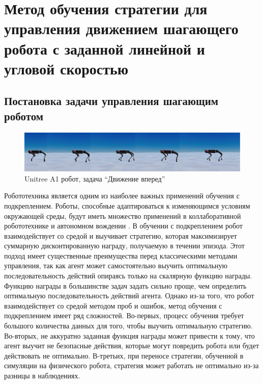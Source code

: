 \chapter{Метод обучения стратегии для управления движением
шагающего робота с заданной линейной и угловой скоростью}\label{ch:ch3}

\section{Постановка задачи управления шагающим роботом}


\begin{figure}[ht]
    \includegraphics[width=1\textwidth]{images/move_forward.png}
    \caption{Unitree A1 робот, задача ``Движение вперед''}
    \label{fig:mv_forward}
\end{figure}


Робототехника является одним из наиболее важных применений обучения с подкреплением. Роботы, способные адаптироваться к изменяющимся условиям окружающей среды, будут иметь множество применений в коллаборативной робототехнике \cite{levine2016end} и автономном вождении \cite{kiran2021deep}. В обучении с подкреплением робот взаимодействует со средой и выучивает стратегию, которая максимизирует суммарную дисконтированную награду, получаемую в течении эпизода.  Этот подход имеет существенные преимущества перед классическими методами управления, так как агент может самостоятельно выучить оптимальную последовательность действий опираясь только на скалярную функцию награды. Функцию награды в большинстве задач задать сильно проще, чем определить оптимальную последовательность действий агента. Однако из-за того, что робот взаимодействует со средой методом проб и ошибок, метод обучения с подкреплением имеет ряд сложностей. Во-первых, процесс обучения требует большого количества данных для того, чтобы выучить оптимальную стратегию. Во-вторых, не аккуратно заданная функция награды может привести к тому, что агент выучит не безопасные действия, которые могут повредить робота или будет действовать не оптимально. В-третьих, при переносе стратегии, обученной в симуляции на физического робота, стратегия может работать не оптимально из-за разницы в наблюдениях. 

